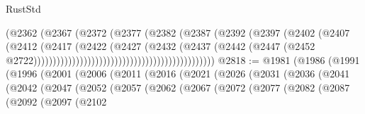 \begin{lexlean}{RustStd}
\begin{coremodule}
                                                            (@2362
                                                              (@2367
                                                                (@2372
                                                                  (@2377
                                                                    (@2382
                                                                      (@2387
                                                                        (@2392
                                                                          (@2397
                                                                            (@2402
                                                                              (@2407
                                                                                (@2412
                                                                                  (@2417
                                                                                    (@2422
                                                                                      (@2427
                                                                                        (@2432
                                                                                          (@2437
                                                                                            (@2442
                                                                                              (@2447
                                                                                                (@2452
                                                                                                  @2722)))))))))))))))))))))))))))))))))))))))))))))))
@2818 := @1981
    (@1986
      (@1991
        (@1996
          (@2001
            (@2006
              (@2011
                (@2016
                  (@2021
                    (@2026
                      (@2031
                        (@2036
                          (@2041
                            (@2042
                              (@2047
                                (@2052
                                  (@2057
                                    (@2062
                                      (@2067
                                        (@2072
                                          (@2077
                                            (@2082
                                              (@2087
                                                (@2092
                                                  (@2097
                                                    (@2102

\end{coremodule}
\end{lexlean}
